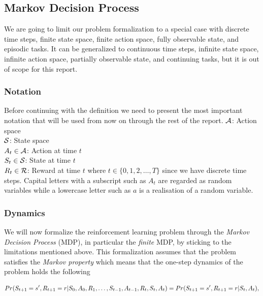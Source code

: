 \documentclass[result.tex]{subfiles}
\begin{document}
    \subsection*{Markov Decision Process}

    We are going to limit our problem formalization to a special case with discrete time steps, finite state space, finite action space, fully observable state, and episodic tasks. It can be generalized to continuous time steps, infinite state space, infinite action space, partially observable state, and continuing tasks, but it is out of scope for this report.

    \subsubsection*{Notation}

    Before continuing with the definition we need to present the most important notation that will be used from now on through the rest of the report.
    \newline
    $\mathcal{A}$: Action space \\
    $\mathcal{S}$: State space \\
    $A_t \in \mathcal{A}$: Action at time $t$ \\
    $S_t \in \mathcal{S}$: State at time $t$ \\
    $R_t \in \mathcal{R}$: Reward at time $t$
    \newline
    where $t \in \{ 0, 1, 2, \ldots, T \}$ since we have discrete time steps. Capital letters with a subscript such as $A_t$ are regarded as random variables while a lowercase letter such as $a$ is a realisation of a random variable.

    \subsubsection*{Dynamics}

    We will now formalize the reinforcement learning problem through the \textit{Markov Decision Process} (MDP), in particular the \textit{finite} MDP, by sticking to the limitations mentioned above. This formalization assumes that the problem satisfies the \textit{Markov property} which means that the one-step dynamics of the problem holds the following

    \begin{align*}
        Pr(S_{t + 1} = s^\prime, R_{t + 1} = r | S_0, A_0, R_1, \ldots, S_{t - 1}, A_{t - 1}, R_t, S_t, A_t) = Pr(S_{t + 1} = s^\prime, R_{t + 1} = r | S_t, A_t),
    \end{align*}
\end{document}
